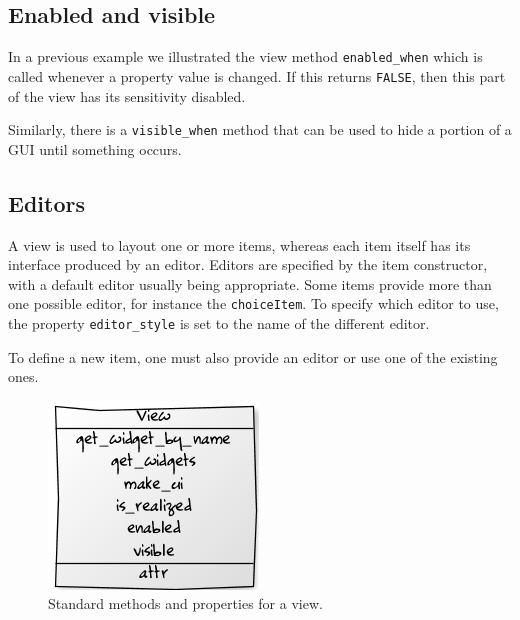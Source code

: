 \documentclass{article}
\newcommand{\code}[1]{\texttt{#1}} %
\newcommand{\function}[1]{\code{#1}} %
\newcommand{\constructor}[1]{\function{#1}\index{#1}}
\newcommand{\generic}[1]{\code{#1}} %
\newcommand{\meth}[1]{\generic{#1}}     %
\newcommand{\property}[1]{\code{#1}}     %
\begin{document}
\subsection{Enabled and visible}
\label{sec:enabled-visible}

In a previous example we illustrated the view method
\meth{enabled\_when} which is called whenever a property value is
changed. If this returns \code{FALSE}, then this part of the view has
its sensitivity disabled.

Similarly, there is a \meth{visible\_when} method that can be used to
hide a portion of a GUI until something occurs.


\subsection{Editors}
\label{sec:editors}

A view is used to layout one or more items, whereas each item itself
has its interface produced by an editor. Editors are specified by the
item constructor, with a default editor usually being
appropriate. Some items provide more than one possible editor, for
instance the \constructor{choiceItem}. To specify which editor to use, the
property \property{editor\_style} is set to the name of the different
editor. 

To define a new item, one must also provide an editor or use one of
the existing ones. 





\begin{figure}
  \centering
  \includegraphics[]{uml-view}
  \caption{Standard methods and properties for a view.}
  \label{fig:uml-view}
\end{figure}

\end{document}
